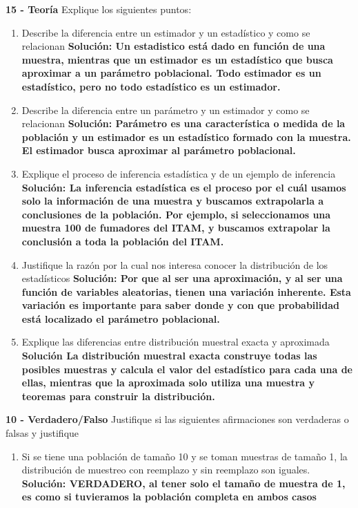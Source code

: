 \documentclass[addpoints]{exam}
\theoremstyle{mytheor}
\begin{document}
\begin{questions}
\begin{enumerate}
  \end{enumerate}
  
  \newpage
  
  \question \textbf{15 - Teoría}
  Explique los siguientes puntos:
  
  \begin{enumerate}
  \item Describe la diferencia entre un estimador y un estadístico y como se relacionan
  \subitem \textbf{Solución: Un estadistico está dado en función de una muestra, mientras que un estimador es un estadístico que busca aproximar a un parámetro poblacional. Todo estimador es un estadístico, pero no todo estadístico es un estimador.}
  
  
  \item Describe la diferencia entre un parámetro y un estimador y como se relacionan
  \subitem \textbf{Solución: Parámetro es una característica o medida de la población y un estimador es un estadístico formado con la muestra. El estimador busca aproximar al parámetro poblacional. }
  
  
  \item Explique el proceso de inferencia estadística y de un ejemplo de inferencia
  \subitem \textbf{Solución: La inferencia estadística es el proceso por el cuál usamos solo la información de una muestra y buscamos extrapolarla a conclusiones de la población. Por ejemplo, si seleccionamos una muestra 100 de fumadores del ITAM, y buscamos extrapolar la conclusión a toda la población del ITAM.}
  
  \item Justifique la razón por la cual nos interesa conocer la distribución de los estadísticos
  \subitem \textbf{Solución: Por que al ser una aproximación, y al ser una función de variables aleatorias, tienen una variación inherente. Esta variación es importante para saber donde y con que probabilidad está localizado el parámetro poblacional.}
  
  \item Explique las diferencias entre distribución muestral exacta y aproximada
  \subitem \textbf{Solución La distribución muestral exacta construye todas las posibles muestras y calcula el valor del estadístico para cada una de ellas, mientras que la aproximada solo utiliza una muestra y teoremas para construir la distribución. }
  
  \end{enumerate}
  
  \question \textbf{10 - Verdadero/Falso}
  Justifique si las siguientes afirmaciones son verdaderas o falsas y justifique 
  \begin{enumerate}
  \item Si se tiene una población de tamaño 10 y se toman muestras de tamaño 1, la distribución de muestreo con reemplazo y sin reemplazo son iguales. 
  \subitem \textbf{Solución: VERDADERO, al tener solo el tamaño de muestra de 1, es como si tuvieramos la población completa en ambos casos}
  

\end{enumerate}
\end{questions}
\end{document}
